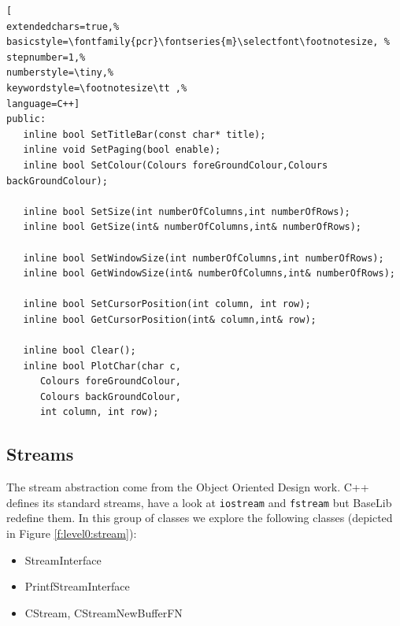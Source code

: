 \begin{lstlisting}[
extendedchars=true,%
basicstyle=\fontfamily{pcr}\fontseries{m}\selectfont\footnotesize, %
stepnumber=1,%
numberstyle=\tiny,%
keywordstyle=\footnotesize\tt ,%
language=C++]
public:
   inline bool SetTitleBar(const char* title);
   inline void SetPaging(bool enable);
   inline bool SetColour(Colours foreGroundColour,Colours backGroundColour);

   inline bool SetSize(int numberOfColumns,int numberOfRows);
   inline bool GetSize(int& numberOfColumns,int& numberOfRows);

   inline bool SetWindowSize(int numberOfColumns,int numberOfRows);
   inline bool GetWindowSize(int& numberOfColumns,int& numberOfRows);

   inline bool SetCursorPosition(int column, int row);
   inline bool GetCursorPosition(int& column,int& row);

   inline bool Clear();
   inline bool PlotChar(char c,
      Colours foreGroundColour,
      Colours backGroundColour,
      int column, int row);
\end{lstlisting}



\subsection{Streams}
The stream abstraction come from the Object Oriented Design work. C++ defines its standard streams, have a look at \texttt{iostream} and \texttt{fstream} but BaseLib redefine them. In this group of classes we explore the following classes (depicted in Figure \ref{f:level0:stream}):
\begin{itemize}
 \item StreamInterface
 \item PrintfStreamInterface
 \item CStream, CStreamNewBufferFN
\end{itemize}

